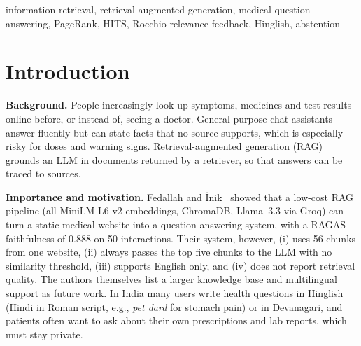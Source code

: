 \documentclass[conference]{IEEEtran}
\begin{document}
\begin{IEEEkeywords}
information retrieval, retrieval-augmented generation, medical question answering, PageRank, HITS, Rocchio relevance feedback, Hinglish, abstention
\end{IEEEkeywords}

\section{Introduction}
\textbf{Background.} People increasingly look up symptoms, medicines and test results online before, or instead of, seeing a doctor. General-purpose chat assistants answer fluently but can state facts that no source supports, which is especially risky for doses and warning signs. Retrieval-augmented generation (RAG)~\cite{lewis2020} grounds an LLM in documents returned by a retriever, so that answers can be traced to sources.

\textbf{Importance and motivation.} Fedallah and \.{I}nik~\cite{fedallah2026} showed that a low-cost RAG pipeline (all-MiniLM-L6-v2 embeddings, ChromaDB, Llama~3.3 via Groq) can turn a static medical website into a question-answering system, with a RAGAS~\cite{es2024} faithfulness of 0.888 on 50 interactions. Their system, however, (i) uses 56 chunks from one website, (ii) always passes the top five chunks to the LLM with no similarity threshold, (iii) supports English only, and (iv) does not report retrieval quality. The authors themselves list a larger knowledge base and multilingual support as future work. In India many users write health questions in Hinglish (Hindi in Roman script, e.g., \textit{pet dard} for stomach pain) or in Devanagari, and patients often want to ask about their own prescriptions and lab reports, which must stay private.
\end{document}

